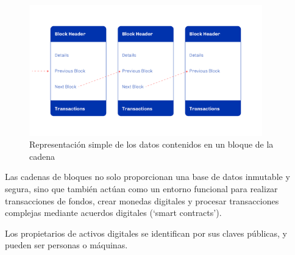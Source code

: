 \documentclass[12pt]{book}
\begin{document}
\begin{figure}
    \centering
    \includegraphics[width=0.9\textwidth]{Bloques.png}
    \caption{Representación simple de los datos contenidos en un bloque de la cadena}\label{fig:Bloques}
\end{figure}

Las cadenas de bloques no solo proporcionan una base de datos inmutable y segura, sino que también actúan como un entorno funcional para realizar transacciones de fondos, crear monedas digitales y procesar transacciones complejas mediante acuerdos digitales (`smart contracts').



Los propietarios de activos digitales se identifican por sus claves públicas, y pueden ser personas o máquinas.
\end{document}
